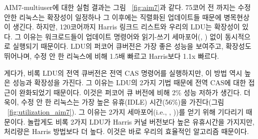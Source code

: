 AIM7-multiuser에 대한 실험 결과는 그림 ~\ref{fig:aim7}과 같다.
75코어 전 까지는 수정 안한 리눅스는 확장성이 일정하나 그 이후에는 직렬화된 업데이트들 때문에
병목현상이 생긴다. 
하지만, 120코어까지 Harris 링크드 리스트와 우리의 LDU는 확장성이 있다. 
그 이유는 워크로드들이 업데이트 명령어와 읽기-쓰기 세마포어(,
) 없이 동시적으로 실행되기 때문이다.
LDU의 퍼코어 큐버전은 가장 좋은 성능을 보여주고, 확장성도 뛰어나며, 
수정 안 한 리눅스에 비해 1.5배 빠르고 Harris보다 1.1x 빠르다.

게다가, 비록 LDU의 전역 큐버전은 전역 CAS 명령어를 실행하지만, 이 방법 역시 높은 성능과 확장성을 가진다.
그 이유는 LDU의 2가지 기법 때문에 전역 CAS에 대한 접근이 완화되었기 때문이다.
이것은 퍼코어 큐 버전에 비해 2\% 성능 저하가 생긴다. 
더욱이, 수정 안 한 리눅스는 가장 높은 유휴(IDLE) 시간(56\%)을 가진다(그림 ~\ref{fig:utilization_aim7}). 
그 이유는 2가지 세마포어(i.e.,
, ))를 얻기 위해 기다리기 때문이다.
놀랍게도 비록 2가지 LDU가 Harris 커널 버전보다 높은 유휴시간을 가지지만, 처리량은 Harris 방법보다 더 높다.
이것은 바로 우리의 효율적인 알고리즘 때문이다. 

